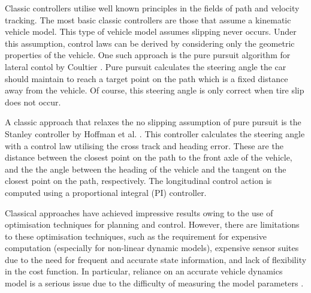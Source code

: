 Classic controllers utilise well known principles in the fields of path and velocity tracking.
The most basic classic controllers are those that assume a kinematic vehicle model.
This type of vehicle model assumes slipping never occurs.
Under this assumption, control laws can be derived by considering only the geometric properties of the vehicle.
One such approach is the pure pursuit algorithm for lateral contol by Coultier \cite{Coulter_1992}. 
Pure pursuit calculates the steering angle the car should maintain to reach a target point on the path which is a fixed distance away from the vehicle.
Of course, this steering angle is only correct when tire slip does not occur.

A classic approach that relaxes the no slipping assumption of pure pursuit is the Stanley controller by Hoffman et al. \cite{Hoffmann2007}.
This controller calculates the steering angle with a control law utilising the cross track and heading error.
These are the distance between the closest point on the path to the front axle of the vehicle, and the the angle between the heading of the vehicle and the tangent on the closest point on the path, respectively.
The longitudinal control action is computed using a proportional integral (PI) controller.




Classical approaches have achieved impressive results owing to the use of optimisation techniques for planning and control. 
However, there are limitations to these optimisation techniques, such as the requirement for expensive computation (especially for non-linear dynamic models), expensive sensor suites due to the need for frequent and accurate state information, and lack of flexibility in the cost function. 
In particular, reliance on an accurate vehicle dynamics model is a serious issue due to the difficulty of measuring the model parameters \cite{Kabzan2019, Pan2017}.



